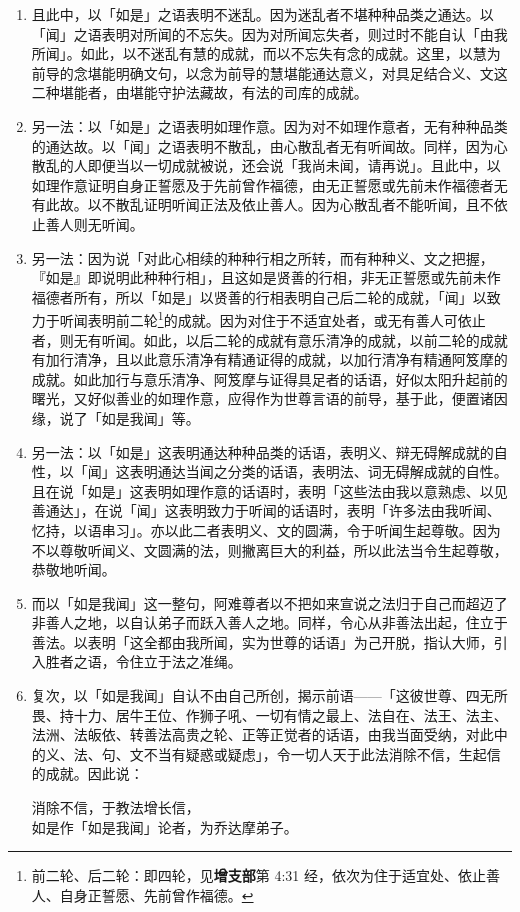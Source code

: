 \begin{enumerate}
\item 且此中，以「如是」之语表明不迷乱。因为迷乱者不堪种种品类之通达。以「闻」之语表明对所闻的不忘失。因为对所闻忘失者，则过时不能自认「由我所闻」。如此，以不迷乱有慧的成就，而以不忘失有念的成就。这里，以慧为前导的念堪能明确文句，以念为前导的慧堪能通达意义，对具足结合义、文这二种堪能者，由堪能守护法藏故，有法的司库的成就。
\item 另一法：以「如是」之语表明如理作意。因为对不如理作意者，无有种种品类的通达故。以「闻」之语表明不散乱，由心散乱者无有听闻故。同样，因为心散乱的人即便当以一切成就被说，还会说「我尚未闻，请再说」。且此中，以如理作意证明自身正誓愿及于先前曾作福德，由无正誓愿或先前未作福德者无有此故。以不散乱证明听闻正法及依止善人。因为心散乱者不能听闻，且不依止善人则无听闻。
\item 另一法：因为说「对此心相续的种种行相之所转，而有种种义、文之把握，『如是』即说明此种种行相」，且这如是贤善的行相，非无正誓愿或先前未作福德者所有，所以「如是」以贤善的行相表明自己后二轮的成就，「闻」以致力于听闻表明前二轮\footnote{前二轮、后二轮：即四轮，见\textbf{增支部}第 4:31 经，依次为住于适宜处、依止善人、自身正誓愿、先前曾作福德。}的成就。因为对住于不适宜处者，或无有善人可依止者，则无有听闻。如此，以后二轮的成就有意乐清净的成就，以前二轮的成就有加行清净，且以此意乐清净有精通证得的成就，以加行清净有精通阿笈摩的成就。如此加行与意乐清净、阿笈摩与证得具足者的话语，好似太阳升起前的曙光，又好似善业的如理作意，应得作为世尊言语的前导，基于此，便置诸因缘，说了「如是我闻」等。
\item 另一法：以「如是」这表明通达种种品类的话语，表明义、辩无碍解成就的自性，以「闻」这表明通达当闻之分类的话语，表明法、词无碍解成就的自性。且在说「如是」这表明如理作意的话语时，表明「这些法由我以意熟虑、以见善通达」，在说「闻」这表明致力于听闻的话语时，表明「许多法由我听闻、忆持，以语串习」。亦以此二者表明义、文的圆满，令于听闻生起尊敬。因为不以尊敬听闻义、文圆满的法，则撇离巨大的利益，所以此法当令生起尊敬，恭敬地听闻。
\item 而以「如是我闻」这一整句，阿难尊者以不把如来宣说之法归于自己而超迈了非善人之地，以自认弟子而跃入善人之地。同样，令心从非善法出起，住立于善法。以表明「这全都由我所闻，实为世尊的话语」为己开脱，指认大师，引入胜者之语，令住立于法之准绳。
\item 复次，以「如是我闻」自认不由自己所创，揭示前语——「这彼世尊、四无所畏、持十力、居牛王位、作狮子吼、一切有情之最上、法自在、法王、法主、法洲、法皈依、转善法高贵之轮、正等正觉者的话语，由我当面受纳，对此中的义、法、句、文不当有疑惑或疑虑」，令一切人天于此法消除不信，生起信的成就。因此说：\begin{quoting}消除不信，于教法增长信，\\如是作「如是我闻」论者，为乔达摩弟子。\end{quoting}

\end{enumerate}
